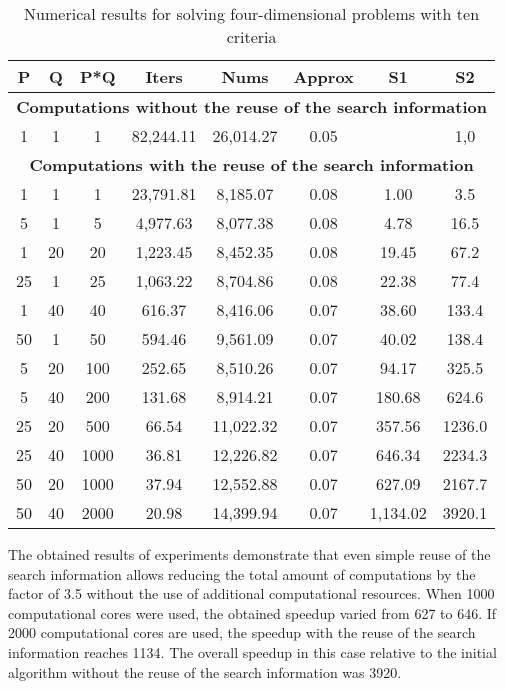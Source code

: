 \begin{table}[ht]
\centering
\caption{Numerical results for solving four-dimensional problems with ten criteria}
\label{tab:01}
\begin{tabular}{cccccccc}
\hline
P     & Q     & P*Q    & Iters       & Nums        & Approx   & S1         & S2       \\ \hline
\multicolumn{8}{c}{\textbf{Computations without the reuse of the search information}} \\ \hline
1     & 1     & 1      & 82,244.11   & 26,014.27   & 0.05     &            & 1,0      \\ \hline
\multicolumn{8}{c}{\textbf{Computations with the reuse of the search information}}    \\ \hline
1     & 1     & 1      & 23,791.81   & 8,185.07    & 0.08     & 1.00       & 3.5      \\
5     & 1     & 5      & 4,977.63    & 8,077.38    & 0.08     & 4.78       & 16.5     \\
1     & 20    & 20     & 1,223.45    & 8,452.35    & 0.08     & 19.45      & 67.2     \\
25    & 1     & 25     & 1,063.22    & 8,704.86    & 0.08     & 22.38      & 77.4     \\
1     & 40    & 40     & 616.37      & 8,416.06    & 0.07     & 38.60      & 133.4    \\
50    & 1     & 50     & 594.46      & 9,561.09    & 0.07     & 40.02      & 138.4    \\
5     & 20    & 100    & 252.65      & 8,510.26    & 0.07     & 94.17      & 325.5    \\
5     & 40    & 200    & 131.68      & 8,914.21    & 0.07     & 180.68     & 624.6    \\
25    & 20    & 500    & 66.54       & 11,022.32   & 0.07     & 357.56     & 1236.0   \\
25    & 40    & 1000   & 36.81       & 12,226.82   & 0.07     & 646.34     & 2234.3   \\
50    & 20    & 1000   & 37.94       & 12,552.88   & 0.07     & 627.09     & 2167.7   \\
50    & 40    & 2000   & 20.98       & 14,399.94   & 0.07     & 1,134.02   & 3920.1   \\ \hline
\end{tabular}
\end{table}

The obtained results of experiments demonstrate that even simple reuse of the search information allows reducing the total amount of computations by the factor of 3.5 without the use of additional computational resources. When 1000 computational cores were used, the obtained speedup varied from 627 to 646. If 2000 computational cores are used, the speedup with the reuse of the search information reaches 1134. The overall speedup in this case relative to the initial algorithm without the reuse of the search information was 3920.

